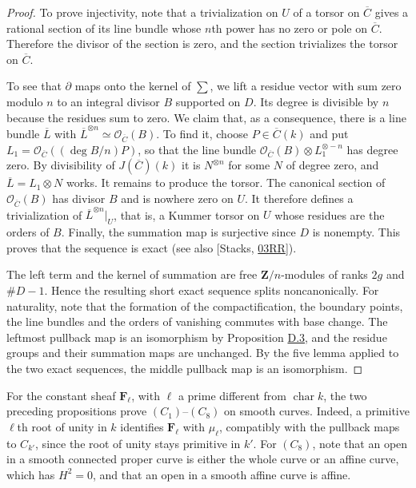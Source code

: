 \documentclass[11pt]{article}
\begin{document}
\begin{proof}[{Proof}]
To prove injectivity, note that a trivialization on \(U\) of a torsor on \(\overline C\) gives a rational section of its line bundle whose \(n\)th power has no zero or pole on \(\overline C\).  Therefore the divisor of the section is zero, and the section trivializes the torsor on \(\overline C\).

To see that \(\partial\) maps onto the kernel of \(\sum\), we lift a residue vector with sum zero modulo \(n\) to an integral divisor \(B\) supported on \(D\). Its degree is divisible by \(n\) because the residues sum to zero. We claim that, as a consequence, there is a line bundle \(\overline L\) with \(\overline L^{\otimes n}\simeq\mathcal O_{\overline C}(B)\). To find it, choose \(P\in\overline C(k)\) and put \(L_1=\mathcal O_{\overline C}((\deg B/n)P)\), so that the line bundle \(\mathcal O_{\overline C}(B)\otimes L_1^{\otimes-n}\) has degree zero. By divisibility of \(J(\overline C)(k)\) it is \(N^{\otimes n}\) for some \(N\) of degree zero, and \(\overline L=L_1\otimes N\) works. It remains to produce the torsor. The canonical section of \(\mathcal O_{\overline C}(B)\) has divisor \(B\) and is nowhere zero on \(U\). It therefore defines a trivialization of \(\overline L^{\otimes n}|_U\), that is, a Kummer torsor on \(U\) whose residues are the orders of \(B\). Finally, the summation map is surjective since \(D\) is nonempty. This proves that the sequence is exact (see also [Stacks, \href{https://stacks.math.columbia.edu/tag/03RR}{03RR}]).

The left term and the kernel of summation are free \(\mathbf Z/n\)-modules of ranks \(2g\) and \(\#D-1\). Hence the resulting short exact sequence splits noncanonically. For naturality, note that the formation of the compactification, the boundary points, the line bundles and the orders of vanishing commutes with base change. The leftmost pullback map is an isomorphism by Proposition \hyperref[bp10]{D.3}, and the residue groups and their summation maps are unchanged. By the five lemma applied to the two exact sequences, the middle pullback map is an isomorphism.
\end{proof}

\label{bp17}%
For the constant sheaf \(\mathbf F_\ell\), with \(\ell\) a prime different from \(\operatorname{char}k\), the two preceding propositions prove \((C_1)\)–\((C_8)\) on smooth curves. Indeed, a primitive \(\ell\)th root of unity in \(k\) identifies \(\mathbf F_\ell\) with \(\mu_\ell\), compatibly with the pullback maps to \(C_{k'}\), since the root of unity stays primitive in \(k'\). For \((C_8)\), note that an open in a smooth connected proper curve is either the whole curve or an affine curve, which has \(H^2=0\), and that an open in a smooth affine curve is affine.
\end{document}
